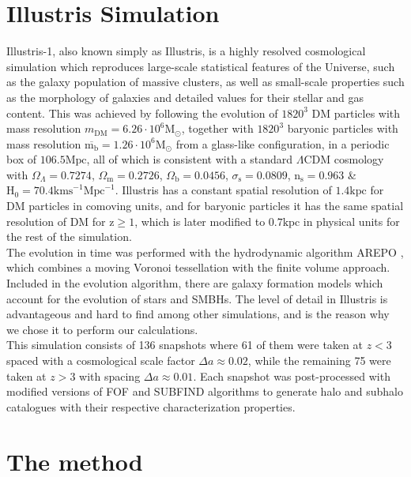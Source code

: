 \documentclass[a4paper,fleqn,usenatbib]{mnras}
\begin{document}
\section{Illustris Simulation}
Illustris-1, also known simply as Illustris, is a highly resolved cosmological simulation which reproduces large-scale statistical features of the Universe, such as the galaxy population of massive clusters, as well as small-scale properties such as the morphology of galaxies and detailed values for their stellar and gas content. This was achieved by following the evolution of $1820^3$ DM particles with mass resolution $m_{\text{DM}} = 6.26\cdot 10^6\text{M}_{\odot}$, together with $1820^3$ baryonic particles with mass resolution $\overline{\text{m}_\text{b}}=1.26\cdot 10^6\text{M}_{\odot}$ from a glass-like configuration, in a periodic box of $106.5\text{Mpc}$, all of which is consistent with a standard $\Lambda \text{CDM}$ cosmology with $\Omega_\Lambda=0.7274$, $\Omega_\text{m}=0.2726$, $\Omega_\text{b}=0.0456$, $\sigma_\text{s}=0.0809$, $\text{n}_\text{s}=0.963$ \& $\text{H}_0=70.4\text{kms}
^{-1}\text{Mpc}^{-1}$. Illustris has a constant spatial resolution of $1.4\text{kpc}$ for DM particles in comoving units, and for baryonic particles it has the same spatial resolution of DM for $\text{z}\geq 1$, which is later modified to $0.7\text{kpc}$ in physical units for the rest of the simulation. \\

The evolution in time was performed with the hydrodynamic algorithm AREPO \cite{arepo}, which combines a moving Voronoi tessellation with the finite volume approach. Included in the evolution algorithm, there are galaxy formation models which account for the evolution of stars and SMBHs. The level of detail in Illustris is advantageous and hard to find among other simulations, and is the reason why we chose it to perform our calculations.\\

This simulation consists of 136 snapshots where 61 of them were taken at $z < 3$ spaced with a cosmological scale factor $\Delta a \approx 0.02$, while the remaining 75 were taken at $z > 3$ with spacing $\Delta a \approx 0.01$. Each snapshot was post-processed with modified versions of FOF and SUBFIND algorithms \cite{fof,subfind} to generate halo and subhalo catalogues with their respective characterization properties.  

\section{The method}
\end{document}
